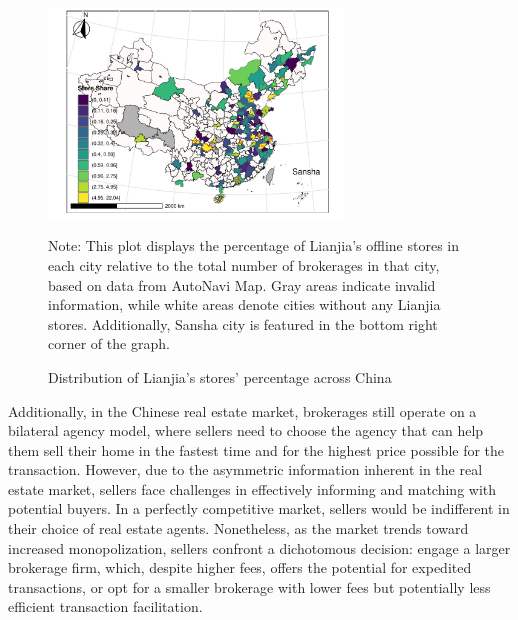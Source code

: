 \documentclass[11pt]{article}
\begin{document}
\begin{figure}[H]
  \centering
  \includegraphics[width=0.7\textwidth]{../figures/distribution_of_cities_share.pdf}
  \caption{Distribution of Lianjia's stores' percentage across China}
  \label{fig:precise_proportion_contraction}
  Note: This plot displays the percentage of Lianjia's offline stores in each city relative to the total number of brokerages in that city, based on data from AutoNavi Map. Gray areas indicate invalid information, while white areas denote cities without any Lianjia stores. Additionally, Sansha city is featured in the bottom right corner of the graph.
\end{figure}

Additionally, in the Chinese real estate market, brokerages still operate on a bilateral agency model, where sellers need to choose the agency that can help them sell their home in the fastest time and for the highest price possible for the transaction. However, due to the asymmetric information inherent in the real estate market, sellers face challenges in effectively informing and matching with potential buyers. In a perfectly competitive market, sellers would be indifferent in their choice of real estate agents. Nonetheless, as the market trends toward increased monopolization, sellers confront a dichotomous decision: engage a larger brokerage firm, which, despite higher fees, offers the potential for expedited transactions, or opt for a smaller brokerage with lower fees but potentially less efficient transaction facilitation.
\end{document}
